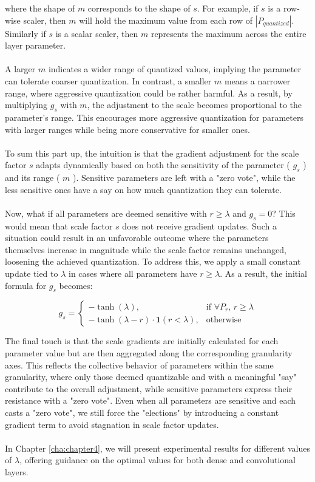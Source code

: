 \noindent where the shape of \( m \) corresponds to the shape of \( s \).
For example, if \( s \) is a row-wise scaler, then \( m  \) will hold
the maximum value from each row of \( \left| P_{quantized} \right|\).
Similarly if  \( s \) is a scalar scaler, then \( m \) represents
the maximum across the entire layer parameter.
\\
\\
A larger \( m \) indicates a wider range of quantized values,
implying the parameter can tolerate coarser quantization.
In contrast, a smaller \( m \) means a narrower range,
where aggressive quantization could be rather harmful.
As a result, by multiplying \( g_s\) with \( m \), 
the adjustment to the scale becomes proportional to the parameter's range.
This encourages more aggressive quantization for parameters with larger ranges
while being more conservative for smaller ones.
\\
\\
To sum this part up, the intuition is that the gradient adjustment for the scale factor
\( s \) adapts dynamically based on both the sensitivity of the parameter ( \( g_s\) )
and its range ( \( m \) ). Sensitive parameters are left with a "zero vote",
while the less sensitive ones have a say on how much quantization they can tolerate.
\\
\\
Now, what if all parameters are deemed sensitive with \( r \geq \lambda\) and
\( g_s =  0 \)? This would mean that scale factor \(s\) does not receive gradient updates.
Such a situation could result in an unfavorable outcome
where the parameters themselves increase in magnitude while the scale factor remains unchanged,
loosening the achieved quantization.
To address this, we apply a small constant update tied to \( \lambda \) in cases where 
all parameters have \( r \geq \lambda\). As a result, the initial formula for \( g_s\) becomes:

\[
g_s = 
\begin{cases} 
- \tanh(\lambda), & \text{if } \forall P_r, \, r \geq \lambda \\
- \tanh(\lambda - r) \cdot \mathbf{1}(r < \lambda), & \text{otherwise}
\end{cases}
\]

\noindent The final touch is that the scale gradients are initially calculated for each parameter value
but are then aggregated along the corresponding granularity axes.
This reflects the collective behavior of parameters within the same granularity,
where only those deemed quantizable and with a meaningful "say" contribute to the overall adjustment,
while sensitive parameters express their resistance with a "zero vote".
Even when all parameters are sensitive and each casts a "zero vote", 
we still force the "elections" by introducing a constant gradient term
to avoid stagnation in scale factor updates.
\\
\\
In Chapter \ref{cha:chapter4}, we will present experimental results for different values of 
\( \lambda \), offering guidance on the optimal values for both dense and convolutional layers.

